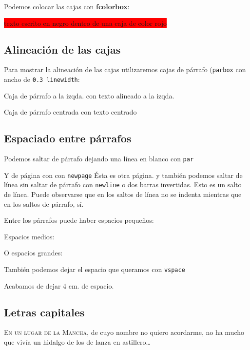 \documentclass[11pt,twoside,a4paper]{article}
\begin{document}
Podemos colocar las cajas con \textbf{fcolorbox}:

\colorbox{red}{texto escrito en negro dentro de una caja de color rojo}
\\



\subsection{Alineación de las cajas}
\label{sec:alineacioncajas}

Para mostrar la alineación de las cajas utilizaremos cajas de párrafo (\texttt{parbox} con ancho de \texttt{0.3 linewidth}:

\parbox[b]{0.3\linewidth}{\raggedright{Caja de párrafo a la izqda. con texto alineado a la izqda.}}
\parbox[b]{0.3\linewidth}{\centering Caja de párrafo centrada con texto centrado}
\parbox[b]{0.3\linewidth}{}

\subsection{Espaciado entre párrafos}
\label{sec:espaciadoparrafos}

Podemos saltar de párrafo dejando una línea en blanco con \texttt{par}\par Y de página con con \texttt{newpage}\newpage{}
Ésta es otra página. y también podemos saltar de línea sin saltar de párrafo con \texttt{newline} o dos barras invertidas.\newline{} Esto es un salto de línea. Puede observarse que en los saltos de línea no se indenta mientras que en los saltos de párrafo, sí.

Entre los párrafos puede haber espacios pequeños:\smallskip{}

Espacios medios:
\medskip{}

O espacios grandes:
\bigskip{}

También podemos dejar el espacio que queramos con \texttt{vspace}\vspace{4cm}

Acabamos de dejar 4 cm. de espacio.
\subsection{Letras capitales}
\label{sec:letrascapitales}
\lettrine{E}{n un lugar de la Mancha}, de cuyo nombre no quiero acordarme, no ha mucho que vivía un hidalgo de los de lanza en astillero\ldots{}
\end{document}
